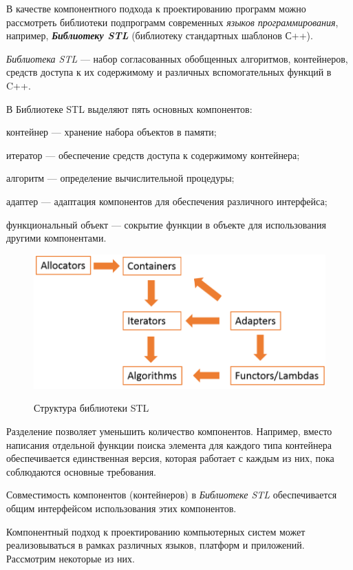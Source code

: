 В качестве компонентного подхода к проектированию программ можно рассмотреть библиотеки подпрограмм современных \textit{языков программирования}, например, \textbf{\textit{Библиотеку STL}} (библиотеку стандартных шаблонов С++).

\textit{Библиотека STL} --- набор согласованных обобщенных алгоритмов, контейнеров, средств доступа к их содержимому и различных вспомогательных функций в C++.

В Библиотеке STL выделяют пять основных компонентов:
\begin{textitemize}
	\item контейнер --- хранение набора объектов в памяти;
	\item итератор --- обеспечение средств доступа к содержимому контейнера;
	\item алгоритм --- определение вычислительной процедуры;
	\item адаптер --- адаптация компонентов для обеспечения различного интерфейса;
	\item функциональный объект --- сокрытие функции в объекте для использования другими компонентами.
\end{textitemize}

\begin{figure}[H]
	\caption{Структура библиотеки STL}
	\includegraphics[scale=0.7]{author/part5/figures/STL.png}
	\label{fig:STL}
\end{figure}

Разделение позволяет уменьшить количество компонентов. Например, вместо написания отдельной функции поиска элемента для каждого типа контейнера обеспечивается единственная версия, которая работает с каждым из них, пока соблюдаются основные требования.

Совместимость компонентов (контейнеров) в \textit{Библиотеке STL} обеспечивается общим интерфейсом использования этих компонентов.

Компонентный подход к проектированию компьютерных систем может реализовываться в рамках различных языков, платформ и приложений. Рассмотрим некоторые из них.


